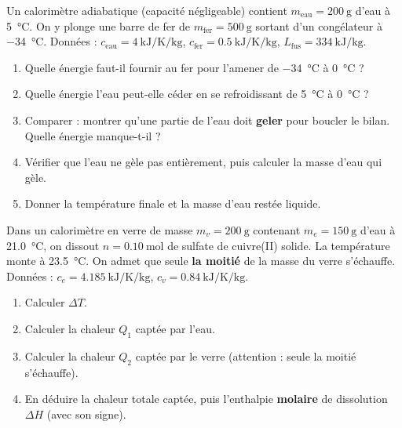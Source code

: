 \documentclass[11pt,a4paper]{article}
\begin{document}
\begin{exercice}
Un calorimètre adiabatique (capacité négligeable) contient $m_{\text{eau}}=\SI{200}{\gram}$ d'eau à
\SI{5}{\celsius}. On y plonge une barre de fer de $m_{\text{fer}}=\SI{500}{\gram}$ sortant d'un
congélateur à \SI{-34}{\celsius}. Données : $c_{\text{eau}}=\SI{4}{\kilo\joule\per\kelvin\per\kilogram}$,
$c_{\text{fer}}=\SI{0.5}{\kilo\joule\per\kelvin\per\kilogram}$, $L_{\text{fus}}=\SI{334}{\kilo\joule\per\kilogram}$.
\begin{enumerate}[label=\alph*),leftmargin=2em,topsep=2pt,itemsep=2pt]
  \item Quelle énergie faut-il fournir au fer pour l'amener de \SI{-34}{\celsius} à \SI{0}{\celsius} ?
  \item Quelle énergie l'eau peut-elle céder en se refroidissant de \SI{5}{\celsius} à \SI{0}{\celsius} ?
  \item Comparer : montrer qu'une partie de l'eau doit \textbf{geler} pour boucler le bilan. Quelle
        énergie manque-t-il ?
  \item Vérifier que l'eau ne gèle pas entièrement, puis calculer la masse d'eau qui gèle.
  \item Donner la température finale et la masse d'eau restée liquide.
\end{enumerate}
\end{exercice}

\begin{exercice}
Dans un calorimètre en verre de masse $m_v=\SI{200}{\gram}$ contenant $m_e=\SI{150}{\gram}$ d'eau à
\SI{21.0}{\celsius}, on dissout $n=\SI{0.10}{\mol}$ de sulfate de cuivre(II) solide. La température monte
à \SI{23.5}{\celsius}. On admet que seule \textbf{la moitié} de la masse du verre s'échauffe. Données :
$c_e=\SI{4.185}{\kilo\joule\per\kelvin\per\kilogram}$, $c_v=\SI{0.84}{\kilo\joule\per\kelvin\per\kilogram}$.
\begin{enumerate}[label=\alph*),leftmargin=2em,topsep=2pt,itemsep=2pt]
  \item Calculer $\Delta T$.
  \item Calculer la chaleur $Q_1$ captée par l'eau.
  \item Calculer la chaleur $Q_2$ captée par le verre (attention : seule la moitié s'échauffe).
  \item En déduire la chaleur totale captée, puis l'enthalpie \textbf{molaire} de dissolution $\Delta H$
        (avec son signe).
\end{enumerate}
\end{exercice}
\end{document}
